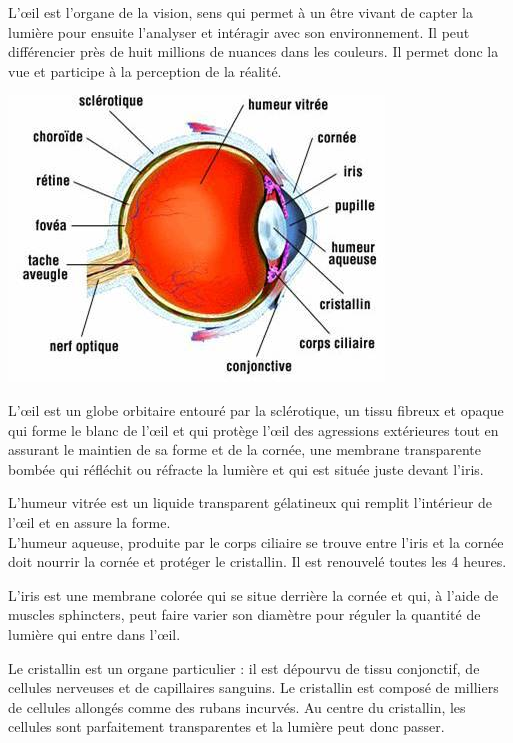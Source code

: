 \documentclass[12pt, a4paper]{report}
\begin{document}
L'\oe il est l'organe de la vision, sens qui permet à un être vivant de capter la lumière pour ensuite l'analyser et intéragir avec son environnement.
Il peut différencier près de huit millions de nuances dans les couleurs.
Il permet donc la vue et participe à la perception de la réalité.

\begin{center}
\includegraphics[scale=0.5]{oeil.jpg}
\end{center}

L'\oe il est un globe orbitaire entouré par la sclérotique, un tissu fibreux et opaque qui forme le blanc de l'\oe il et qui protège l'\oe il des agressions extérieures tout en assurant le maintien de sa forme et de la cornée, une membrane transparente bombée qui réfléchit ou réfracte la lumière et qui est située juste devant l'iris.

L'humeur vitrée est un liquide transparent gélatineux qui remplit l'intérieur de l'\oe il et en assure la forme.\\
L'humeur aqueuse, produite par le corps ciliaire se trouve entre l'iris et la cornée doit nourrir la cornée et protéger le cristallin. Il est renouvelé toutes les 4 heures.

L'iris est une membrane colorée qui se situe derrière la cornée et qui, à l'aide de muscles sphincters, peut faire varier son diamètre pour réguler la quantité de lumière qui entre dans l'\oe il.

\newpage

Le cristallin est un organe particulier : il est dépourvu de tissu conjonctif, de cellules nerveuses et de capillaires sanguins. Le cristallin est composé de milliers de cellules allongés comme des rubans incurvés. Au centre du cristallin, les cellules sont parfaitement transparentes et la lumière peut donc passer.
\end{document}
